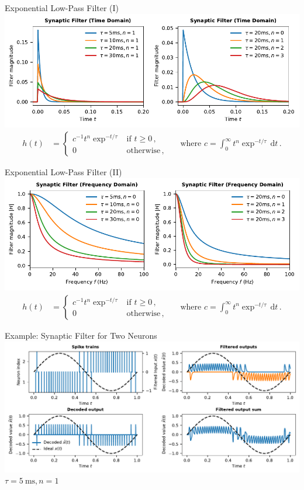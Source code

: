 \documentclass[handout,aspectratio=169]{beamer}
\begin{document}
\begin{frame}{Exponential Low-Pass Filter (I)}
	\includegraphics[width=\textwidth]{media/synaptic_filters.pdf}
	\begin{align*}
			h(t) &= \begin{cases}
		c^{-1} t^n \exp^{-t / \tau} & \text{if } t \geq 0 \,,\\
		0 & \text{otherwise}\,,
		\end{cases}
		&& \text{where } c = \int_{0}^\infty t^n \exp^{-t / \tau} \,\mathrm{d}t \,.
	\end{align*}
\end{frame}

\begin{frame}{Exponential Low-Pass Filter (II)}
	\includegraphics[width=\textwidth]{media/synaptic_filters_freq.pdf}
	\begin{align*}
	h(t) &= \begin{cases}
	c^{-1} t^n \exp^{-t / \tau} & \text{if } t \geq 0 \,,\\
	0 & \text{otherwise}\,,
	\end{cases}
	&& \text{where } c = \int_{0}^\infty t^n \exp^{-t / \tau} \,\mathrm{d}t \,.
	\end{align*}
\end{frame}

\begin{frame}{Example: Synaptic Filter for Two Neurons}
	\includegraphics[width=\textwidth]{media/two_neurons_synaptic_filter.pdf}\\
	\centering $\tau = \SI{5}{\milli\second}, n = 1$
\end{frame}
\end{document}
